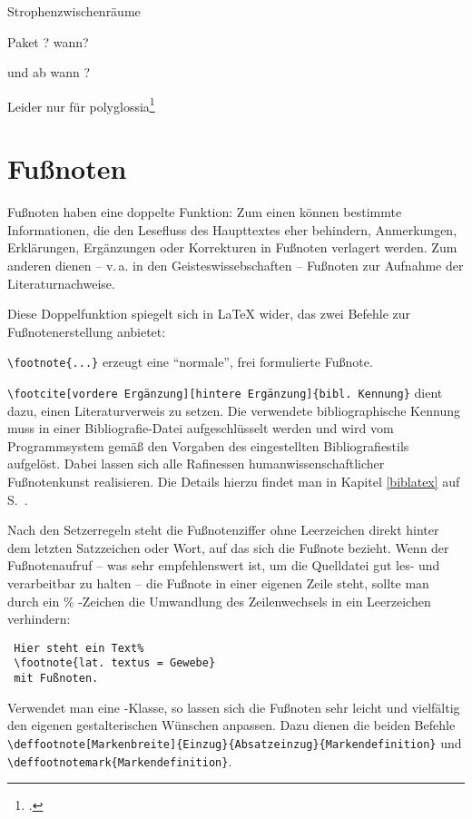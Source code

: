 Strophenzwischenräume

Paket ? wann?

und ab wann ?



Leider nur für polyglossia\footcite[33\psqq]{rouquette:2012}

\section{Fußnoten}

Fußnoten haben eine doppelte Funktion: 
Zum einen können bestimmte Informationen, die den Lesefluss des Haupttextes eher behindern,
Anmerkungen, Erklärungen, Ergänzungen oder Korrekturen in Fußnoten verlagert werden.
Zum anderen dienen -- v.\,a. in den Geisteswissebschaften -- Fußnoten zur Aufnahme der 
Literaturnachweise.

Diese Doppelfunktion spiegelt sich in \LaTeX{} wider, das zwei Befehle zur Fußnotenerstellung
anbietet:

\lstinline/\footnote{...}/ erzeugt eine \enquote{normale}, frei formulierte Fußnote.

\lstinline/\footcite[vordere Ergänzung][hintere Ergänzung]{bibl. Kennung}/ dient dazu,
einen Literaturverweis zu setzen. Die verwendete bibliographische Kennung muss in einer
Bibliografie-Datei aufgeschlüsselt werden und wird vom Programmsystem gemäß den Vorgaben
des eingestellten Bibliografiestils aufgelöst. Dabei lassen sich alle Rafinessen 
humanwissenschaftlicher Fußnotenkunst realisieren. 
Die Details hierzu findet man in Kapitel \ref{biblatex} auf S.~\pageref{biblatex}. 

Nach den Setzerregeln steht die Fußnotenziffer ohne Leerzeichen direkt hinter dem letzten
Satzzeichen oder Wort, auf das sich die Fußnote bezieht.
Wenn der Fußnotenaufruf -- was sehr empfehlenswert ist, um die Quelldatei gut les- und 
verarbeitbar zu halten -- die Fußnote in einer eigenen Zeile steht, sollte man durch ein 
\% -Zeichen die Umwandlung des Zeilenwechsels in ein Leerzeichen verhindern:

\begin{lstlisting}
 Hier steht ein Text%
 \footnote{lat. textus = Gewebe}
 mit Fußnoten.
\end{lstlisting}



Verwendet man eine \KOMAScript -Klasse, so lassen sich die Fußnoten sehr leicht und vielfältig
den eigenen gestalterischen Wünschen anpassen. Dazu dienen die beiden Befehle
\lstinline/\deffootnote[Markenbreite]{Einzug}{Absatzeinzug}{Markendefinition}/
und 
\lstinline/\deffootnotemark{Markendefinition}/.


